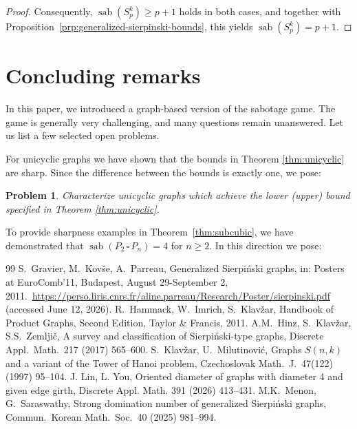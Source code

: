 \documentclass[10pt,a4paper]{amsart}
\newtheorem{problem}{Problem}
\newcommand{\cp}{\,\square\,}
\DeclareMathOperator{\sab}{\mathrm{sab}}
\begin{document}
\begin{proof}
Consequently, $\sab(S_p^k)\ge p+1$ holds in both cases, and together with Proposition~\ref{prp:generalized-sierpinski-bounds}, this yields $\sab(S_p^k)=p+1$.
\end{proof}

\section{Concluding remarks}

In this paper, we introduced a graph-based version of the sabotage game. The game is generally very challenging, and many questions remain unanswered. Let us list a few selected open problems. 

For unicyclic graphs we have shown that the bounds in Theorem \ref{thm:unicyclic} are sharp. Since the difference between the bounds is exactly one, we pose:

\begin{problem}
Characterize unicyclic graphs which achieve the lower (upper) bound specified in Theorem \ref{thm:unicyclic}.
\end{problem}

To provide sharpness examples in Theorem~\ref{thm:subcubic}, we have demonstrated that $\sab(P_2\cp P_n) = 4$ for  $n\ge 2$. In this direction we pose:


\begin{thebibliography}{99}
 S.~Gravier, M.~Kov\v se, A.~Parreau, Generalized Sierpi\'{n}ski graphs, in: Posters at EuroComb'11, Budapest, August 29-September 2, 2011.\ \url{https://perso.liris.cnrs.fr/aline.parreau/Research/Poster/sierpinski.pdf} (accessed June 12, 2026).
 R.~Hammack, W.~Imrich, S.~Klav\v{z}ar, Handbook of Product Graphs, Second Edition, Taylor \& Francis, 2011.
 A.M.~Hinz, S.~Klav\v zar, S.S.~Zemlji\v c, A survey and classification of Sierpi\'{n}ski-type graphs, Discrete Appl.\ Math.\ 217 (2017) 565--600.
 S.~Klav\v zar, U.~Milutinovi\'c, Graphs $S(n,k)$ and a variant of the Tower of Hanoi problem, Czechoslovak Math.\ J.\ 47(122) (1997) 95--104.
 J. Lin, L. You, Oriented diameter of graphs with diameter 4 and given edge girth, Discrete Appl. Math. 391 (2026) 413--431.
 M.K.~Menon, G.~Saraswathy, Strong domination number of generalized Sierpi\'{n}ski graphs, Commun.\ Korean Math.\ Soc.\ 40 (2025) 981--994.
\end{thebibliography}
\end{document}

